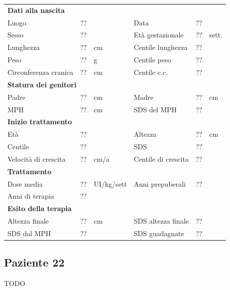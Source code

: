 \begin{table}[!h]
\begin{tabular}{lrllrl}
\toprule
\multicolumn{6}{l}{\textbf{Dati alla nascita}}\\
Luogo 		& \multicolumn{2}{l}{??} 	& Data 					& \multicolumn{2}{l}{??} 	\\
Sesso 		& \multicolumn{2}{l}{??} 	& Età gestazionale 		& ?? 		& sett.\\
Lunghezza 	& ?? 		& cm 				& Centile lunghezza		& ?? 		\\
Peso 		& ?? 		& g					& Centile peso			& ?? 		\\
Circonferenza cranica	& ?? 		& cm 	& Centile c.c.			& ?? \\
\midrule
\multicolumn{6}{l}{\textbf{Statura dei genitori}}\\
Padre 		& ?? & cm 	& Madre 				& ?? & cm \\
MPH 		& ?? & cm 	& SDS del MPH 			& ??\\
\midrule
\multicolumn{6}{l}{\textbf{Inizio trattamento}} \\
Età	& ?? & 		& Altezza 				& ?? & cm  \\
Centile & ?? 	 &		& SDS		& ?? \\
Velocità di crescita & ?? & cm/a	& Centile di crescita & ??\\
\midrule
\multicolumn{6}{l}{\textbf{Trattamento}} \\
Dose media		& ?? & UI/kg/sett & Anni prepuberali & ??\\
Anni di terapia & ??\\
\midrule
\multicolumn{6}{l}{\textbf{Esito della terapia}} \\
Altezza finale			& ?? & cm 	& SDS altezza finale		& ??\\
SDS dal MPH				& ?? &		& SDS guadagnate 			& ??\\
\bottomrule
\end{tabular}
\end{table}
\clearpage


\subsection*{Paziente 22}

TODO

